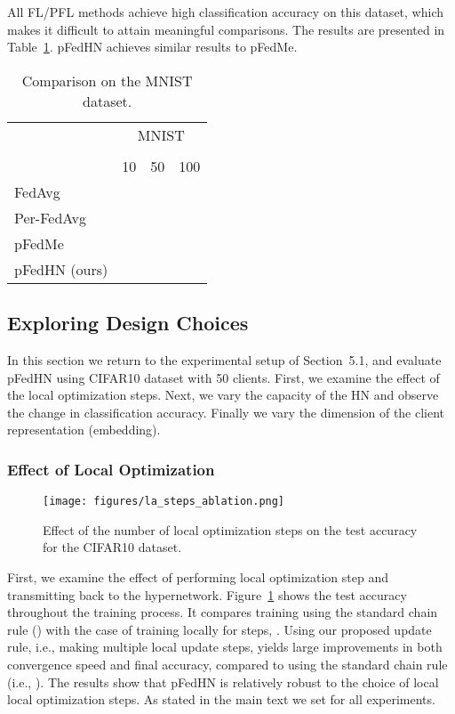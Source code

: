 \documentclass{article}
\newcommand\ourmethod{pFedHN}
\begin{document}
All FL/PFL methods achieve high classification accuracy on this dataset, which makes it difficult to attain meaningful comparisons. The results are presented in Table~\ref{tab:mnist_hetro}. \ourmethod{} achieves similar results to pFedMe.

\begin{table}[th]
    \vskip 0.15in
\tiny
    \centering
    \caption{Comparison on the MNIST dataset.}
    \begin{tabular}{l c c c }
    \toprule
    & \multicolumn{3}{c}{MNIST}\\
     \cmidrule{2-4}\\
     & 10  & 50 & 100\\
    \midrule
    FedAvg &  &  & \\
    Per-FedAvg &  &  & \\
    pFedMe &  &  & \\
    \midrule
    \ourmethod{} (ours) &  &  & \\
    \bottomrule
    \end{tabular}
    \label{tab:mnist_hetro}
\end{table}


\subsection{Exploring Design Choices}


In this section we return to the experimental setup of Section~5.1, 
and evaluate \ourmethod{} using CIFAR10 dataset with 50 clients. First, we examine the effect of the local optimization steps. Next, we vary the capacity of the HN and observe the change in classification accuracy. Finally we vary the dimension of the client representation (embedding).

\subsubsection{Effect of Local Optimization}

\begin{figure}[h]
    \centering
    \texttt{[image: figures/la\_steps\_ablation.png]}
    \caption{Effect of the number of local optimization steps on the test accuracy for the CIFAR10 dataset.}
    \label{fig:local_opt}
\end{figure}

First, we examine the effect of performing local optimization step and transmitting  back to the hypernetwork. Figure~\ref{fig:local_opt} shows the test accuracy throughout the training process. 
It compares training using the standard chain rule () with the case of training locally for  steps, .
Using our proposed update rule, i.e., making multiple local update steps, yields large improvements in both convergence speed and final accuracy, compared to using the standard chain rule (i.e., ). The results show that \ourmethod{} is relatively robust to the choice of local local optimization steps. As stated in the main text we set  for all experiments.
\end{document}
